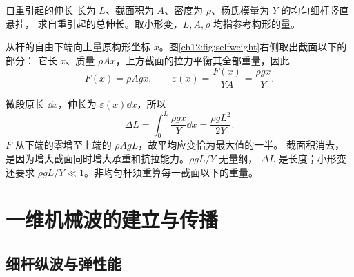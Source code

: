 \begin{origexamplebox}{自重引起的伸长}
\label{ch12:ex:01}
长为 $L$、截面积为 $A$、密度为 $\rho$、杨氏模量为 $Y$ 的均匀细杆竖直悬挂，
求自重引起的总伸长。取小形变，$L,A,\rho$ 均指参考构形的量。

\ThQSelfWeight
\end{origexamplebox}
\begin{xesolution}
从杆的自由下端向上量原构形坐标 $x$。图\ref{ch12:fig:selfweight}右侧取出截面以下的部分：
它长 $x$、质量 $\rho Ax$，上方截面的拉力平衡其全部重量，因此
\[
 F(x)=\rho Agx,\qquad \varepsilon(x)=\frac{F(x)}{YA}=\frac{\rho gx}{Y}.
\]
\begin{center}\begin{minipage}{\linewidth}\centering
{}
\label{ch12:fig:selfweight}
\end{minipage}\end{center}
微段原长 $\dd x$，伸长为 $\varepsilon(x)\dd x$，所以
\[
 \boxed{\Delta L=\int_0^L\frac{\rho gx}{Y}\dd x=\frac{\rho gL^2}{2Y}}.
\]
$F$ 从下端的零增至上端的 $\rho AgL$，故平均应变恰为最大值的一半。
截面积消去，是因为增大截面同时增大承重和抗拉能力。$\rho gL/Y$ 无量纲，
$\Delta L$ 是长度；小形变还要求 $\rho gL/Y\ll1$。非均匀杆须重算每一截面以下的重量。
\end{xesolution}

\section{一维机械波的建立与传播}
\subsection{细杆纵波与弹性能}

